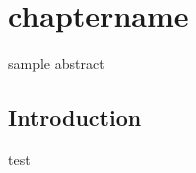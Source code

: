

\chapter{chaptername} %

\label{Chapter2} %


\begin{singlespace}


\begin{chapabstract}
    sample abstract
\end{chapabstract}


\end{singlespace}

\clearpage
\setcounter{page}{1}


	\section{Introduction}

test


